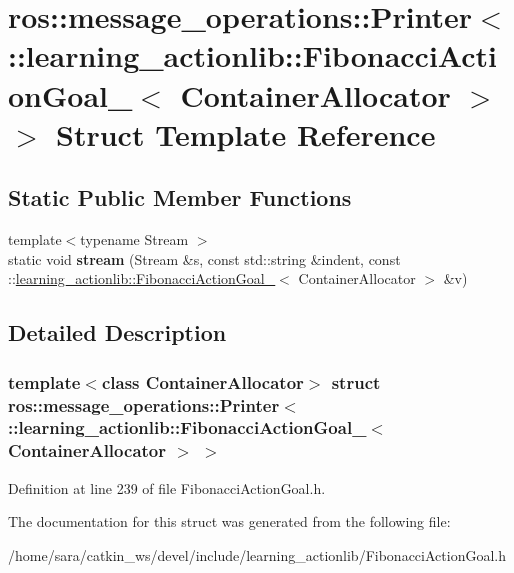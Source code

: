 \hypertarget{structros_1_1message__operations_1_1Printer_3_01_1_1learning__actionlib_1_1FibonacciActionGoal__a142da759d63ba35b99437ad95f83262}{}\section{ros\+:\+:message\+\_\+operations\+:\+:Printer$<$ \+:\+:learning\+\_\+actionlib\+:\+:Fibonacci\+Action\+Goal\+\_\+$<$ Container\+Allocator $>$ $>$ Struct Template Reference}
\label{structros_1_1message__operations_1_1Printer_3_01_1_1learning__actionlib_1_1FibonacciActionGoal__a142da759d63ba35b99437ad95f83262}
\subsection*{Static Public Member Functions}
\begin{DoxyCompactItemize}
\item 
\mbox{\label{structros_1_1message__operations_1_1Printer_3_01_1_1learning__actionlib_1_1FibonacciActionGoal__a142da759d63ba35b99437ad95f83262_a5c21e87ee856aab7f0dc183e014a5b0c}} 
{\footnotesize template$<$typename Stream $>$ }\\static void {\bfseries stream} (Stream \&s, const std\+::string \&indent, const \+::\hyperlink{structlearning__actionlib_1_1FibonacciActionGoal__}{learning\+\_\+actionlib\+::\+Fibonacci\+Action\+Goal\+\_\+}$<$ Container\+Allocator $>$ \&v)
\end{DoxyCompactItemize}


\subsection{Detailed Description}
\subsubsection*{template$<$class Container\+Allocator$>$\newline
struct ros\+::message\+\_\+operations\+::\+Printer$<$ \+::learning\+\_\+actionlib\+::\+Fibonacci\+Action\+Goal\+\_\+$<$ Container\+Allocator $>$ $>$}



Definition at line 239 of file Fibonacci\+Action\+Goal.\+h.



The documentation for this struct was generated from the following file\+:\begin{DoxyCompactItemize}
\item 
/home/sara/catkin\+\_\+ws/devel/include/learning\+\_\+actionlib/Fibonacci\+Action\+Goal.\+h\end{DoxyCompactItemize}
